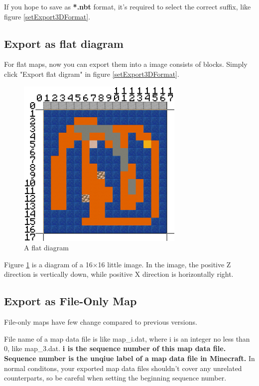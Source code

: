 \documentclass{article}
\begin{document}
If you hope to save as \textbf{*.nbt} format, it's required to select the correct suffix, like figure \ref*{setExport3DFormat}.

\subsection{Export as flat diagram}
For flat maps, now you can export them into a image consists of blocks. Simply click "Export flat digram" in figure \ref*{setExport3DFormat}.

\begin{figure}[htbp]
    \centering
    \includegraphics[width=8cm]{Img14_FlatDiagram.png}
    \caption{A flat diagram}
    \label{flatDiagram}
\end{figure}

Figure \ref*{flatDiagram} is a diagram of a 16$\times$16 little image. In the image, the positive Z direction is vertically down, while positive X direction is horizontally right.

\subsection{Export as File-Only Map}
File-only maps have few change compared to previous versions.

File name of a map data file is like map\_i.dat, where i is an integer no less than 0, like map\_3.dat. \textbf{i is the sequence number of this map data file. Sequence number is the unqiue label of a map data file in Minecraft.} In normal conditons, your exported map data files shouldn't cover any unrelated counterparts, so be careful when setting the beginning sequence number.
\end{document}
